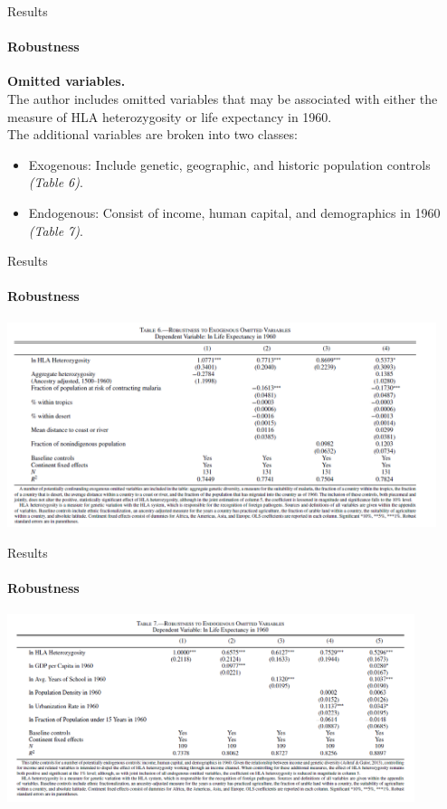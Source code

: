 \documentclass[pdftex,12pt,xcolor=pdftex,table]{beamer}
\theoremstyle{definition}
\theoremstyle{remark}
\numberwithin{equation}{section}
\numberwithin{figure}{section}
\begin{document}
\begin{frame}{Results}
\framesubtitle{Robustness}
\justifying
\textbf{Omitted variables.}\\
The author includes omitted variables that may be associated with either the measure of HLA heterozygosity or life expectancy in 1960.\\

The additional variables are broken into two classes:
\begin{itemize}
    \item Exogenous: Include genetic, geographic, and historic population controls \textit{(Table 6)}.
    \item  Endogenous: Consist of income, human capital, and demographics in 1960 \textit{(Table 7)}.
\end{itemize}
\end{frame}

\begin{frame}{Results}
\framesubtitle{Robustness}
\includegraphics[height=6cm]{Table_6.PNG}
\end{frame}

\begin{frame}{Results}
\framesubtitle{Robustness}
\includegraphics[height=5.5cm]{Table_7.PNG}
\end{frame}
\end{document}
